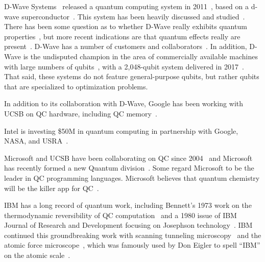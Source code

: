 D-Wave Systems~\cite{D-WaveSystemsHomePage}
released a quantum computing system
in 2011~\cite{WikipediaD-WaveSystems}, based on a d-wave
superconductor~\cite{MHSAmin2000D-Wave-superconductor}.
This system has been heavily discussed and
studied~\cite{KamranKarimi2011D-WaveAdiabatic}.
There has been some question as to whether D-Wave really exhibits quantum
properties~\cite{SeungWooShin2014IsDwaveQuantum}, but more recent
indications are that quantum effects really are
present~\cite{PhysRevA.91.042314,PhysRevX.4.021041}.
D-Wave has a number of customers and
collaborators~\cite{JeffreyBurt2014Google-QC-Chip,PatrickHarris2015QC-Google-NASA-DWave,ToddRWeiss2013Google-QC-AI-Lab}.
In addition, D-Wave is the undisputed champion in the area of commercially
available machines with large numbers of qubits~\cite{WikipediaD-WaveSystems},
with a 2,048-qubit system delivered in
2017~\cite{AgamShah2016D-Wave-2000-qubit,BradJones2017D-Wave2000Sale}.
That said, these systems do not feature general-purpose qubits, but
rather qubits that are specialized to optimization problems.

In addition to its collaboration with D-Wave, Google has been working
with UCSB on QC hardware, including
QC memory~\cite{JaikumarVijayan2015Google-UCSB-QC-Memory}.

Intel is investing \$50M in quantum computing in partnership
with Google, NASA, and USRA~\cite{StaceyHigginbotham2015Intel-QC-invest-50M}.

Microsoft and UCSB have been collaborating on QC since
2004~\cite{PedroHernandez2014MicrosoftStationQ-QC}
and Microsoft has recently formed a new Quantum
division~\cite{PedroHernandez2016Microsoft-QC}.
Some regard Microsoft to be the leader in QC programming languages.
Microsoft believes that quantum chemistry will be the killer app
for QC~\cite{TomSimonite2017QC-MS-Chemistry}.

IBM has a long record of quantum work, including Bennett's
1973 work on the thermodynamic reversibility of QC
computation~\cite{Bennett:1973:LRC:1664562.1664568} and a 1980 issue
of IBM Journal of Research and Development focusing on Josephson
technology~\cite{1980:1663086}.
IBM continued this groundbreaking work with scanning tunneling
microscopy~\cite{Binnig1982SurfaceSTM}
and the atomic force microscope~\cite{1986PhRvL..56..930B},
which was famously used by Don Eigler to spell ``IBM'' on the atomic
scale~\cite{MalcolmWBrowne1990AFM-IBM}.

